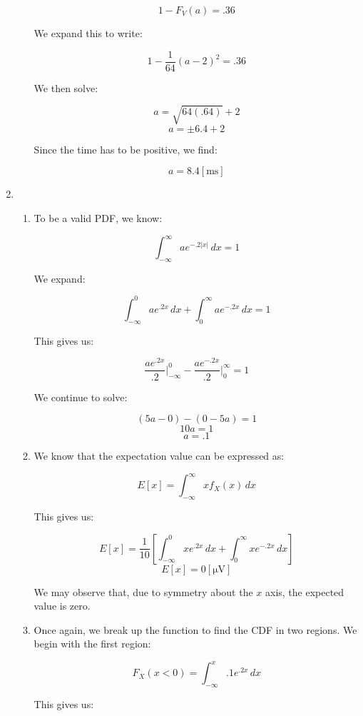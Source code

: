\begin{enumerate}
\begin{enumerate}
        $$1-F_V(a)=.36$$

        We expand this to write:

        $$1-\frac{1}{64}(a-2)^2=.36$$

        We then solve:

        $$a=\sqrt{64(.64)}+2$$
        $$a=\pm6.4+2$$

        Since the time has to be positive, we find:

        $$\boxed{a=8.4[\si{\milli\second}]}$$

    \end{enumerate}

  \item

    \begin{enumerate}

      \item To be a valid PDF, we know:

        $$\int_{-\infty}^{\infty} ae^{-.2|x|}\,dx=1$$

        We expand:

        $$\int_{-\infty}^{0} ae^{.2x}\,dx+\int_0^{\infty} ae^{-.2x}\,dx=1$$

        This gives us:

        $$ \frac{ae^{.2x}}{.2}\Big|_{-\infty}^0-\frac{ae^{-.2x}}{.2}\Big|_{0}^{\infty}=1$$

        We continue to solve:

        $$(5a-0)-(0-5a)=1$$
        $$10a=1$$
        $$\boxed{a=.1}$$

      \item We know that the expectation value can be expressed as:

        $$E[x]=\int_{-\infty}^{\infty} xf_X(x)\,dx$$

        This gives us:

        $$E[x]=\frac{1}{10}\left[\int_{-\infty}^{0} xe^{.2x}\,dx+\int_0^{\infty}xe^{-.2x}\,dx\right]$$
        $$\boxed{E[x]=0[\si{\micro\volt}]}$$

        We may observe that, due to symmetry about the $x$ axis, the expected value is zero.

      \item Once again, we break up the function to find the CDF in two regions. We begin with the first region:

        $$F_X(x<0)=\int_{-\infty}^x .1e^{.2x}\,dx$$

        This gives us:


\end{enumerate}
\end{enumerate}
